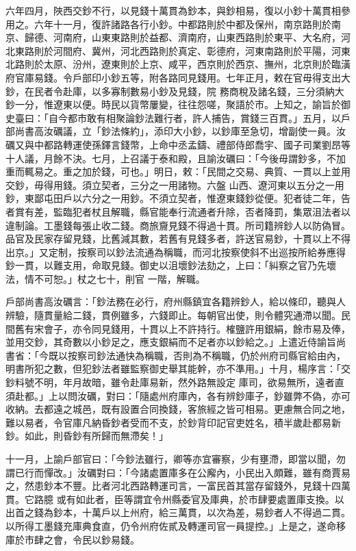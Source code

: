 \begin{pinyinscope}
 六年四月，陜西交鈔不行，以見錢十萬貫為鈔本，與鈔相易，復以小鈔十萬貫相參用之。六年十一月，復許諸路各行小鈔。中都路則於中都及保州，南京路則於南京、歸德、河南府，山東東路則於益都、濟南府，山東西路則於東平、大名府，河北東路則於河間府、冀州，河北西路則於真定、彰德府，河東南路則於平陽，河東北路則於太原、汾州，遼東則於上京、咸平，西京則於西京、撫州，北京則於臨潢府官庫易錢。令戶部印小鈔五等，附各路同見錢用。七年正月，敕在官毋得支出大鈔，在民者令赴庫，以多寡制數易小鈔及見錢，院
 務商稅及諸名錢，三分須納大鈔一分，惟遼東以便。時民以貨幣屢變，往往怨嗟，聚語於市。上知之，諭旨於御史臺曰：「自今都市敢有相聚論鈔法難行者，許人捕告，賞錢三百貫。」五月，以戶部尚書高汝礪議，立「鈔法條約」，添印大小鈔，以鈔庫至急切，增副使一員。汝礪又與中都路轉運使孫鐸言錢幣，上命中丞孟鑄、禮部侍郎喬宇、國子司業劉昂等十人議，月餘不決。七月，上召議于泰和殿，且諭汝礪曰：「今後毋謂鈔多，不加重而輒易之。重之加於錢，可也。」明日，敕：「民間之交易、典質、一貫以上並用交鈔，毋得用錢。須立契者，三分之一用諸物。六盤
 山西、遼河東以五分之一用鈔，東鄙屯田戶以六分之一用鈔。不須立契者，惟遼東錢鈔從便。犯者徒二年，告者賞有差，監臨犯者杖且解職，縣官能奉行流通者升除，否者降罰，集眾沮法者以違制論。工墨錢每張止收二錢。商旅齎見錢不得過十貫。所司籍辨鈔人以防偽冒。品官及民家存留見錢，比舊減其數，若舊有見錢多者，許送官易鈔，十貫以上不得出京。」又定制，按察司以鈔法流通為稱職，而河北按察使斜不出巡按所給券應得鈔一貫，以難支用，命取見錢。御史以沮壞鈔法劾之，上曰：「糾察之官乃先壞法，情不可恕。」杖之七十，削官
 一階，解職。



 戶部尚書高汝礪言：「鈔法務在必行，府州縣鎮宜各籍辨鈔人，給以條印，聽與人辨驗，隨貫量給二錢，貫例雖多，六錢即止。每朝官出使，則令體究通滯以聞。民間舊有宋會子，亦令同見錢用，十貫以上不許持行。榷鹽許用銀絹，餘市易及俸，並用交鈔，其奇數以小鈔足之，應支銀絹而不足者亦以鈔給之。」上遣近侍諭旨尚書省：「今既以按察司鈔法通快為稱職，否則為不稱職，仍於州府司縣官給由內，明書所犯之數，但犯鈔法者雖監察御史舉其能幹，亦不準用。」十月，楊序言：「交鈔料號不明，年月故暗，雖令赴庫易新，然外路無設定
 庫司，欲易無所，遠者直須赴都。」上以問汝礪，對曰：「隨處州府庫內，各有辨鈔庫子，鈔雖弊不偽，亦可收納。去都遠之城邑，既有設置合同換錢，客旅經之皆可相易。更慮無合同之地，難以易者，令官庫凡納昏鈔者受而不支，於鈔背印記官吏姓名，積半歲赴都易新鈔。如此，則昏鈔有所歸而無滯矣！」



 十一月，上諭戶部官曰：「今鈔法雖行，卿等亦宜審察，少有壅滯，即當以聞，勿謂已行而憚改。」汝礪對曰：「今諸處置庫多在公廨內，小民出入頗難，雖有商賈易之，然患鈔本不豐。比者河北西路轉運司言，一富民首其當存留錢外，見錢十四萬貫。它路臆
 或有如此者，臣等謂宜令州縣委官及庫典，於市肆要處置庫支換。以出首之錢為鈔本，十萬戶以上州府，給三萬貫，以次為差，易鈔者人不得過二貫。以所得工墨錢充庫典食直，仍令州府佐貳及轉運司官一員提控。」上是之，遂命移庫於市肆之會，令民以鈔易錢。




\end{pinyinscope}
